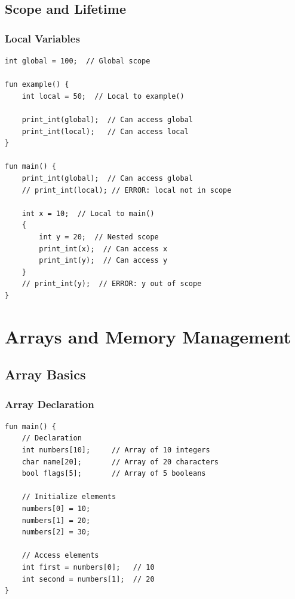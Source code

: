 \documentclass[12pt,a4paper,oneside]{book}
\begin{document}
\section{Scope and Lifetime}

\subsection{Local Variables}

\begin{lstlisting}[style=algo, caption={Variable Scope}]
int global = 100;  // Global scope

fun example() {
    int local = 50;  // Local to example()
    
    print_int(global);  // Can access global
    print_int(local);   // Can access local
}

fun main() {
    print_int(global);  // Can access global
    // print_int(local); // ERROR: local not in scope
    
    int x = 10;  // Local to main()
    {
        int y = 20;  // Nested scope
        print_int(x);  // Can access x
        print_int(y);  // Can access y
    }
    // print_int(y);  // ERROR: y out of scope
}
\end{lstlisting}

\chapter{Arrays and Memory Management}

\section{Array Basics}

\subsection{Array Declaration}

\begin{lstlisting}[style=algo, caption={Array Declaration and Initialization}]
fun main() {
    // Declaration
    int numbers[10];     // Array of 10 integers
    char name[20];       // Array of 20 characters
    bool flags[5];       // Array of 5 booleans
    
    // Initialize elements
    numbers[0] = 10;
    numbers[1] = 20;
    numbers[2] = 30;
    
    // Access elements
    int first = numbers[0];   // 10
    int second = numbers[1];  // 20
}
\end{lstlisting}
\end{document}
